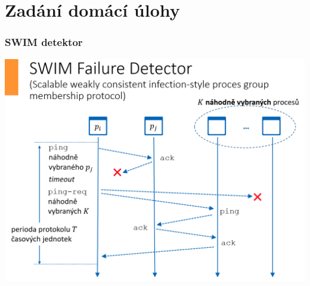 \documentclass[usenames,dvipsnames,9pt]{beamer}
\begin{document}

\section{Zadání domácí úlohy}

\begin{frame}
  \frametitle{SWIM detektor}
  \begin{center}
  \includegraphics[width=\linewidth]{10/figs/swim.png}
  \end{center}
\end{frame}
\end{document}

